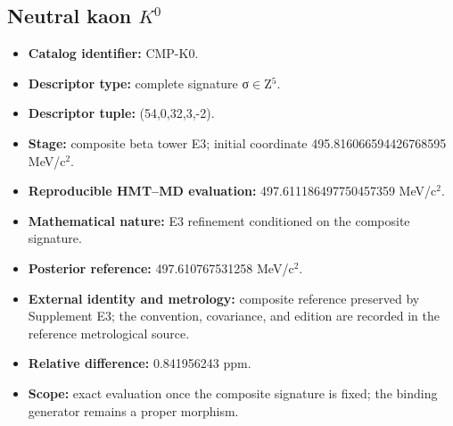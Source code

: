 \subsection{Neutral kaon \texorpdfstring{\(K^{0}\)}{K0}}
\begin{itemize}
\item \textbf{Catalog identifier:} CMP-K0.
\item \textbf{Descriptor type:} complete signature σ\(\in\)Z\({}^{5}\).
\item \textbf{Descriptor tuple:} (54,0,32,3,-2).
\item \textbf{Stage:} composite beta tower E3; initial coordinate 495.816066\allowbreak{}594426\allowbreak{}768595 MeV/c\({}^{2}\).
\item \textbf{Reproducible HMT--MD evaluation:} 497.611186\allowbreak{}497750\allowbreak{}457359 MeV/c\({}^{2}\).
\item \textbf{Mathematical nature:} E3 refinement conditioned on the composite signature.
\item \textbf{Posterior reference:} 497.610767\allowbreak{}531258 MeV/c\({}^{2}\).
\item \textbf{External identity and metrology:} composite reference preserved by Supplement E3; the convention, covariance, and edition are recorded in the reference metrological source.
\item \textbf{Relative difference:} 0.841956\allowbreak{}243 ppm.
\item \textbf{Scope:} exact evaluation once the composite signature is fixed; the binding generator remains a proper morphism.
\end{itemize}
